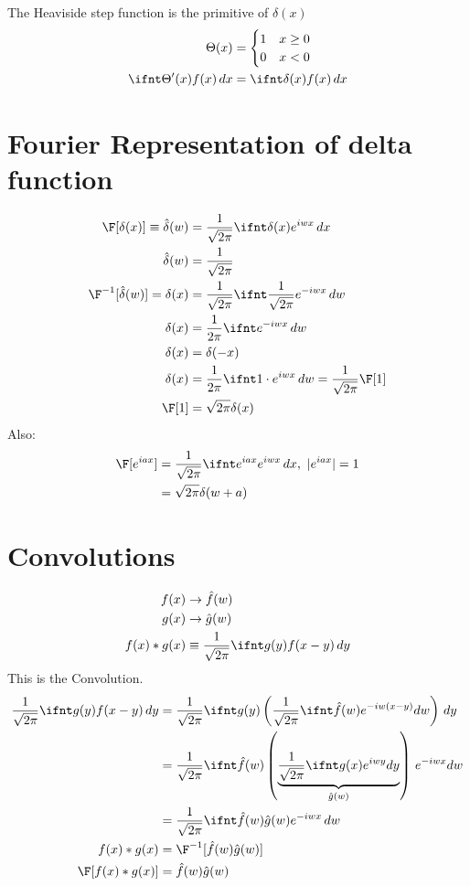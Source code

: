 \documentclass[cplx.tex]{subfiles}
\begin{document}
The Heaviside step function is the primitive of $\delta(x)$
\begin{align}
    \Theta(x) &= \begin{cases} 1 & x \geq 0 \\ 0 & x < 0 \end{cases} \\
    \ifnt \Theta'(x)f(x)\,dx &= \ifnt \delta(x)f(x)\,dx
\end{align}

\section{Fourier Representation of delta function}
\begin{align}
    \F[\delta(x)] \equiv \hat{\delta}(w) &= \frac{1}{\sqrt{2\pi}} \ifnt \delta(x) e^{iwx}\,dx \\
                         \hat{\delta}(w) &= \frac{1}{\sqrt{2\pi}} \\
    \F^{-1}[\hat{\delta}(w)] = \delta(x) &= \frac{1}{\sqrt{2\pi}} \ifnt \frac{1}{\sqrt{2\pi}}e^{-iwx}\,dw \\
    \delta(x) &= \frac{1}{2\pi} \ifnt e^{-iwx}\,dw \\
    \delta(x) &= \delta(-x) \\
    \delta(x) &= \frac{1}{2\pi} \ifnt 1\cdot e^{iwx}\,dw = \frac{1}{\sqrt{2\pi}}\F[1] \\
    \F[1] &= \sqrt{2\pi}\delta(x)
\end{align}
Also:
\begin{align}
    \F[e^{iax}] &= \frac{1}{\sqrt{2\pi}} \ifnt e^{iax}e^{iwx}\,dx,~ |e^{iax}| = 1 \\
                &= \sqrt{2\pi}\delta(w+a)
\end{align}

\section{Convolutions}
\begin{align}
    f(x) &\to \hat{f}(w) \\
    g(x) &\to \hat{g}(w) \\
    f(x)*g(x) &\equiv \frac{1}{\sqrt{2\pi}} \ifnt g(y)f(x-y)\,dy \\
\end{align}
This is the Convolution.
\begin{align}
    \frac{1}{\sqrt{2\pi}} \ifnt g(y)f(x-y)\,dy &= \frac{1}{\sqrt{2\pi}} \ifnt g(y)\left(\frac{1}{\sqrt{2\pi}} \ifnt \hat{f}(w)e^{-iw(x-y)}dw\right)\,dy \\
                                               &= \frac{1}{\sqrt{2\pi}} \ifnt \hat{f}(w)\left(\underbrace{\frac{1}{\sqrt{2\pi}} \ifnt g(x)e^{iwy} dy}_{\hat{g}(w)}\right)\,e^{-iwx} dw \\
                                               &= \frac{1}{\sqrt{2\pi}} \ifnt \hat{f}(w)\hat{g}(w)e^{-iwx}\,dw \\
    f(x)*g(x)  &= \F^{-1}[\hat{f}(w)\hat{g}(w)] \\
    \F[f(x)*g(x)] &= \hat{f}(w)\hat{g}(w)
\end{align}
\end{document}
